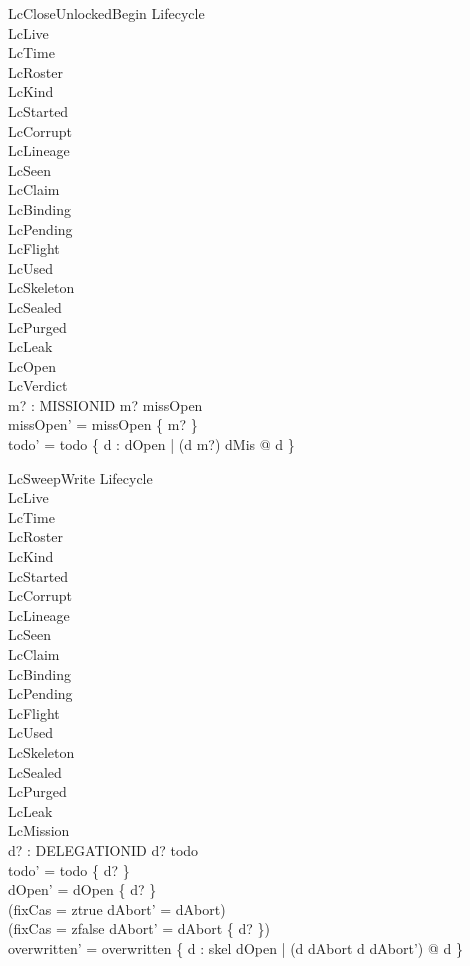 \documentclass[a4paper,10pt,fleqn]{article}
\begin{document}
\begin{schema}{LcCloseUnlockedBegin}
\Delta Lifecycle \\
\Xi LcLive \\
\Xi LcTime \\
\Xi LcRoster \\
\Xi LcKind \\
\Xi LcStarted \\
\Xi LcCorrupt \\
\Xi LcLineage \\
\Xi LcSeen \\
\Xi LcClaim \\
\Xi LcBinding \\
\Xi LcPending \\
\Xi LcFlight \\
\Xi LcUsed \\
\Xi LcSkeleton \\
\Xi LcSealed \\
\Xi LcPurged \\
\Xi LcLeak \\
\Xi LcOpen \\
\Xi LcVerdict \\
m? : MISSIONID
\where
m? \in missOpen \\
missOpen' = missOpen \setminus \{ m? \} \\
todo' = todo \cup \{ d : dOpen | (d \mapsto m?) \in dMis @ d \}
\end{schema}

\begin{schema}{LcSweepWrite}
\Delta Lifecycle \\
\Xi LcLive \\
\Xi LcTime \\
\Xi LcRoster \\
\Xi LcKind \\
\Xi LcStarted \\
\Xi LcCorrupt \\
\Xi LcLineage \\
\Xi LcSeen \\
\Xi LcClaim \\
\Xi LcBinding \\
\Xi LcPending \\
\Xi LcFlight \\
\Xi LcUsed \\
\Xi LcSkeleton \\
\Xi LcSealed \\
\Xi LcPurged \\
\Xi LcLeak \\
\Xi LcMission \\
d? : DELEGATIONID
\where
d? \in todo \\
todo' = todo \setminus \{ d? \} \\
dOpen' = dOpen \setminus \{ d? \} \\
(fixCas = ztrue \implies dAbort' = dAbort) \\
(fixCas = zfalse \implies dAbort' = dAbort \setminus \{ d? \}) \\
overwritten' = overwritten \cup \{ d : skel \setminus dOpen | (d \in dAbort \iff d \notin dAbort') @ d \}
\end{schema}
\end{document}
